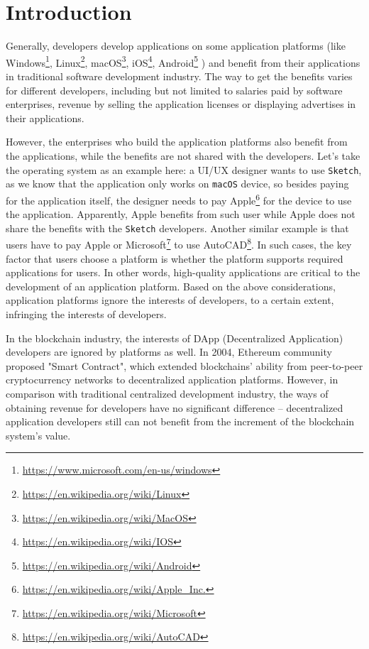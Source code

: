 \section{Introduction}

Generally, developers develop applications on some application platforms (like
Windows\footnote{\url{https://www.microsoft.com/en-us/windows}}, Linux\footnote{\url{https://en.wikipedia.org/wiki/Linux}},
macOS\footnote{\url{https://en.wikipedia.org/wiki/MacOS}},
iOS\footnote{\url{https://en.wikipedia.org/wiki/IOS}},
Android\footnote{\url{https://en.wikipedia.org/wiki/Android}} \etc) and
benefit from their applications in traditional software development industry.
The way to get the benefits varies for different developers, including but not
limited to salaries paid by software enterprises, revenue by selling the
application licenses or displaying advertises in their applications.

However, the enterprises who build the application platforms also benefit
from the applications, while the benefits are not shared with the developers.
Let's take the operating system as an example here: a UI/UX designer wants to use \texttt{Sketch},
as we know that the application only works on \texttt{macOS} device, so besides
paying for the application itself, the designer needs to pay Apple\footnote{\url{https://en.wikipedia.org/wiki/Apple_Inc.}}
for the device  to use the application. Apparently, Apple benefits from such user while
Apple does not share the benefits with the \texttt{Sketch} developers.
Another similar example is that users have to pay Apple or
Microsoft\footnote{\url{https://en.wikipedia.org/wiki/Microsoft}} to use
AutoCAD\footnote{\url{https://en.wikipedia.org/wiki/AutoCAD}}. In such cases,
the key factor that users choose a platform is whether the platform
supports required applications for users. In other words, high-quality
applications are critical to the development of an application platform. Based on the above considerations,  application platforms ignore the interests of developers, to a certain extent, infringing the interests of developers.

In the blockchain industry, the interests of
DApp (Decentralized Application) developers are ignored by platforms  as  well.
 In 2004, Ethereum community proposed "Smart Contract",
which extended blockchains' ability from peer-to-peer
cryptocurrency networks to decentralized application platforms. However, in comparison with traditional centralized development industry, the ways of obtaining revenue for developers have no significant difference -- decentralized application developers still can not benefit
 from the increment of the blockchain system's value.

